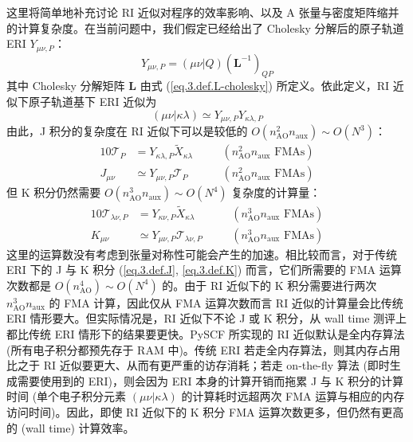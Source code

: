 这里将简单地补充讨论 RI 近似对程序的效率影响、以及 A 张量与密度矩阵缩并的计算复杂度。在当前问题中，我们假定已经给出了 Cholesky 分解后的原子轨道 ERI $Y_{\mu \nu, P}$：
\begin{equation}
  Y_{\mu \nu, P} = (\mu \nu | Q) (\mathbf{L}^{-1})_{QP}
\end{equation}
其中 Cholesky 分解矩阵 $\mathbf{L}$ 由式 (\ref{eq.3.def.L-cholesky}) 所定义。依此定义，RI 近似下原子轨道基下 ERI 近似为
\begin{equation}
  (\mu \nu | \kappa \lambda) \simeq Y_{\mu \nu, P} Y_{\kappa \lambda, P}
\end{equation}
由此，J 积分的复杂度在 RI 近似下可以是较低的 $O(n_\mathrm{AO}^2 n_\mathrm{aux}) \sim O(N^3)$：
\begin{alignat*}{10}
  \mathscr{T}_{P} &= Y_{\kappa \lambda, P} \tilde X_{\kappa \lambda} &&\quad (n_\mathrm{AO}^2 n_\mathrm{aux} \text{ FMAs}) \\
  J_{\mu \nu} &\simeq Y_{\mu \nu, P} \mathscr{T}_P &&\quad (n_\mathrm{AO}^2 n_\mathrm{aux} \text{ FMAs})
\end{alignat*}
但 K 积分仍然需要 $O(n_\mathrm{AO}^3 n_\mathrm{aux}) \sim O(N^4)$ 复杂度的计算量：
\begin{alignat*}{10}
  \mathscr{T}_{\lambda \nu, P} &= Y_{\kappa \nu, P} \tilde X_{\kappa \lambda} &&\quad (n_\mathrm{AO}^3 n_\mathrm{aux} \text{ FMAs}) \\
  K_{\mu \nu} &\simeq Y_{\mu \nu, P} \mathscr{T}_{\lambda \nu, P} &&\quad (n_\mathrm{AO}^3 n_\mathrm{aux} \text{ FMAs})
\end{alignat*}
这里的运算数没有考虑到张量对称性可能会产生的加速。相比较而言，对于传统 ERI 下的 J 与 K 积分 (\ref{eq.3.def.J}, \ref{eq.3.def.K}) 而言，它们所需要的 FMA 运算次数都是 $O(n_\mathrm{AO}^4) \sim O(N^4)$ 的。由于 RI 近似下的 K 积分需要进行两次 $n_\mathrm{AO}^3 n_\mathrm{aux}$ 的 FMA 计算，因此仅从 FMA 运算次数而言 RI 近似的计算量会比传统 ERI 情形要大。但实际情况是，RI 近似下不论 J 或 K 积分，从 wall time 测评上都比传统 ERI 情形下的结果要更快。PySCF 所实现的 RI 近似默认是全内存算法 (所有电子积分都预先存于 RAM 中)。传统 ERI 若走全内存算法，则其内存占用比之于 RI 近似要更大、从而有更严重的访存消耗；若走 on-the-fly 算法 (即时生成需要使用到的 ERI)，则会因为 ERI 本身的计算开销而拖累 J 与 K 积分的计算时间 (单个电子积分元素 $(\mu \nu | \kappa \lambda)$ 的计算耗时远超两次 FMA 运算与相应的内存访问时间)。因此，即使 RI 近似下的 K 积分 FMA 运算次数更多，但仍然有更高的 (wall time) 计算效率。

